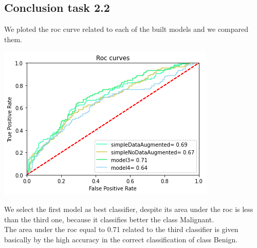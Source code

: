 \documentclass{article}
\begin{document}
\subsection{Conclusion task 2.2}
We ploted the roc curve related to each of the built models and we compared them.
\begin{center}
\begin{minipage}{0.45\textwidth}
        \includegraphics[scale=0.6]{./img/rocScratch2.png}
    \end{minipage}
\end{center}
We select the first model as best classifier, despite its area under the roc is less than the third one, because it classifies better the class Malignant.\\
The area under the roc equal to 0.71 related to the third classifier is given basically by the high accuracy in the correct classification of class Benign.










\clearpage
\end{document}
